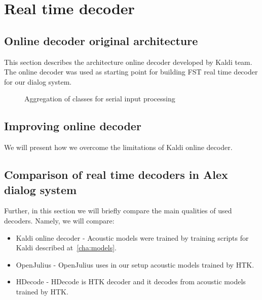 \chapter{Real time decoder}
\label{cha:decoder}


\section{Online decoder original architecture} 
\label{sec:kaldi_decoder_architecture}
This section describes the architecture online decoder developed by Kaldi team.
The online decoder was used as starting point for building \ac{FST} real time decoder for our dialog system.

\begin{figure}[!ph]
    \begin{center}
        
    \caption{Aggregation of classes for serial input processing}
    \label{fig:classes} 
    \end{center}
\end{figure}


\section{Improving online decoder} 
\label{sec:improve}
We will present how we overcome the limitations of Kaldi online decoder.



\section[Comparison of real time decoders]{Comparison of real time decoders in Alex dialog system} 
\label{sec:comparison_of_real_time_decoders_in_alex_dialog_system}
Further, in this section we will briefly compare the main qualities of used decoders.
Namely, we will compare: 
\begin{itemize}
    \item Kaldi online decoder - Acoustic models were trained by training scripts for Kaldi described at~\ref{cha:models}.
    \item OpenJulius - OpenJulius uses in our setup acoustic models trained by \ac{HTK}. 
    \item HDecode - HDecode is \ac{HTK} decoder and it decodes from acoustic models trained by \ac{HTK}.
\end{itemize}


